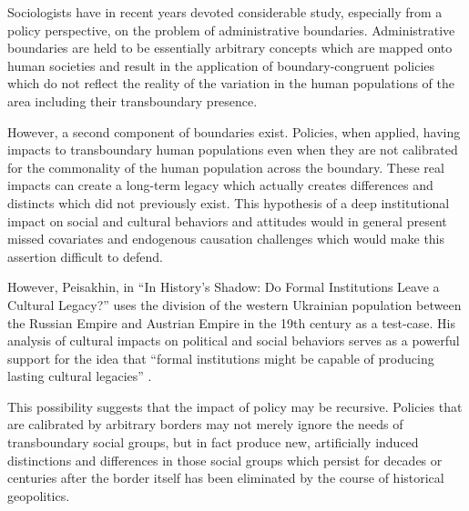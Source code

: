 
Sociologists have in recent years devoted considerable study, especially from a policy perspective, on the problem of administrative boundaries. %
Administrative boundaries are held to be essentially arbitrary concepts which are mapped onto human societies and result in the application of boundary-congruent policies which do not reflect the reality of the variation in the human populations of the area including their transboundary presence.

However, a second component of boundaries exist. Policies, when applied, having impacts to transboundary human populations even when they are not calibrated for the commonality of the human population across the boundary. These real impacts can create a long-term legacy which actually creates differences and distincts which did not previously exist. This hypothesis of a deep institutional impact on social and cultural behaviors and attitudes would in general present missed covariates and endogenous causation challenges which would make this assertion difficult to defend.

However, Peisakhin, in ``In History's Shadow: Do Formal Institutions Leave a Cultural Legacy?'' \cite{peisakhin13} uses the division of the western Ukrainian population between the Russian Empire and Austrian Empire in the 19th century as a test-case. His analysis of cultural impacts on political and social behaviors serves as a powerful support for the idea that ``formal institutions might be capable of producing lasting cultural legacies'' \cite{peisakhin13}.  %

This possibility suggests that the impact of policy may be recursive. Policies that are calibrated by arbitrary borders may not merely ignore the needs of transboundary social groups, but in fact produce new, artificially induced distinctions and differences in those social groups which persist for decades or centuries after the border itself has been eliminated by the course of historical geopolitics.

